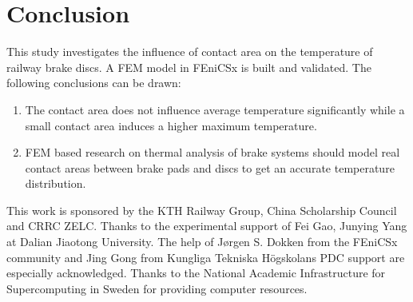 \section*{Conclusion}
This study investigates the influence of contact area on the temperature of railway brake discs. A FEM model in FEniCSx is built and validated. The following conclusions can be drawn:
\begin{enumerate}
\item The contact area does not influence average temperature significantly while a small contact area induces a higher maximum temperature.
\item FEM based research on thermal analysis of brake systems should model real contact areas between brake pads and discs to get an accurate temperature distribution.
\end{enumerate}


\begin{acknowledgement}
This work is sponsored by the KTH Railway Group, China Scholarship Council and CRRC ZELC. Thanks to the experimental support of Fei Gao, Junying Yang at Dalian Jiaotong University. The help of Jørgen S. Dokken from the FEniCSx community and Jing Gong from Kungliga Tekniska Högskolans PDC support are especially acknowledged. Thanks to the National Academic Infrastructure for Supercomputing in Sweden for providing computer resources.        
\end{acknowledgement}






